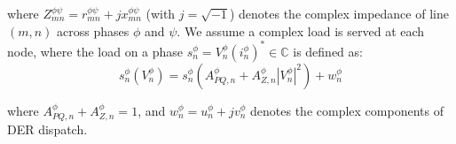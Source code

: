 where $Z^{\phi \psi}_{mn} = r^{\phi \psi}_{mn} + jx^{\phi \psi}_{mn}$ (with $j = \sqrt{-1}$) denotes the complex impedance of line $(m,n)$ across phases $\phi$ and $\psi$. We assume  a complex load is served at each node, where the load on a phase $s_{n}^{\phi} = V_{n}^{\phi} {\left( i_{n}^{\phi} \right)}^{*} \in \mathbb{C}$ is defined as:
\begin{equation}
	s_{n}^{\phi} \left( V_{n}^{\phi} \right) = s_{n}^{\phi} \left(A_{PQ,n}^{\phi} + A_{Z,n}^{\phi} \left| V_{n}^{\phi} \right|^{2} \right) + w_{n}^{\phi}
    \label{eq:sV}
\end{equation}

\noindent where $A_{PQ,n}^{\phi} + A_{Z,n}^{\phi} = 1$, and $w_{n}^{\phi} = u_{n}^{\phi} + j v_{n}^{\phi}$ denotes the complex components of DER dispatch.
